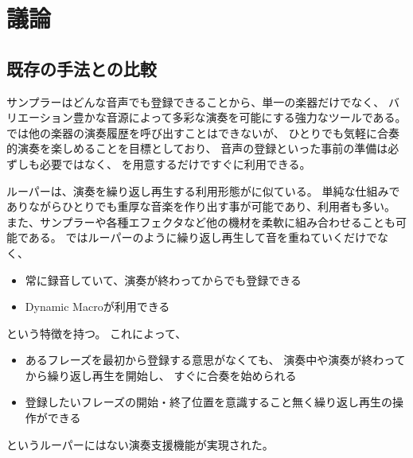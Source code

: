 \section{議論}


\subsection{既存の手法との比較}
サンプラーはどんな音声でも登録できることから、単一の楽器だけでなく、
バリエーション豊かな音源によって多彩な演奏を可能にする強力なツールである。
{\system}では他の楽器の演奏履歴を呼び出すことはできないが、
ひとりでも気軽に合奏的演奏を楽しめることを目標としており、
音声の登録といった事前の準備は必ずしも必要ではなく、
{\system}を用意するだけですぐに利用できる。

ルーパーは、演奏を繰り返し再生する利用形態が{\system}に似ている。
単純な仕組みでありながらひとりでも重厚な音楽を作り出す事が可能であり、利用者も多い。
また、サンプラーや各種エフェクタなど他の機材を柔軟に組み合わせることも可能である。
{\system}ではルーパーのように繰り返し再生して音を重ねていくだけでなく、
\begin{itemize}
\item 常に録音していて、演奏が終わってからでも登録できる
\item Dynamic Macroが利用できる
\end{itemize}
という特徴を持つ。
これによって、
\begin{itemize}
\item あるフレーズを最初から登録する意思がなくても、
  演奏中や演奏が終わってから繰り返し再生を開始し、
  すぐに合奏を始められる
\item 登録したいフレーズの開始・終了位置を意識すること無く繰り返し再生の操作ができる
\end{itemize}
というルーパーにはない演奏支援機能が実現された。






